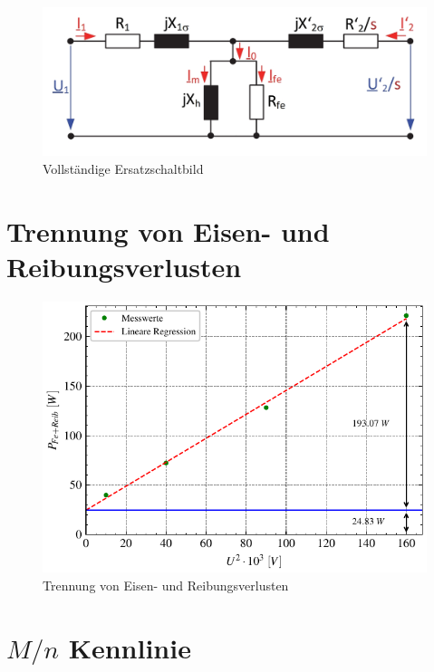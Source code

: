 \documentclass[conference]{IEEEtran}
\begin{document}
\begin{figure}[htbp]
    \centering
    \includegraphics[width=\columnwidth]{./figures/Vollstaendiges_ESB.jpg}
    \caption{Vollständige Ersatzschaltbild}
    \label{fig:ESB_Vollstaendig}
\end{figure}

\newpage
\section{Trennung von Eisen- und Reibungsverlusten}



\begin{figure}[htbp]
    \centering
    \includegraphics[width=\columnwidth]{./figures/trennung_eisen_reib.pdf}
    \caption{Trennung von Eisen- und Reibungsverlusten}
    \label{fig:trennung_von_eisen_reib}
\end{figure}

\section{$M/n$ Kennlinie}
\end{document}
